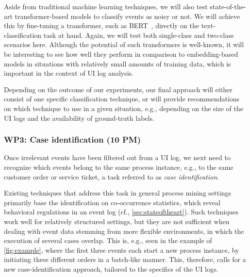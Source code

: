 Aside from traditional machine learning techniques, we will also test state-of-the-art transformer-based models to classify events as noisy or not. We will achieve this by fine-tuning a transformer, such as BERT~\cite{Devlin2019}, directly on the text-classification task at hand. 
Again, we will test both single-class and two-class scenarios here.
\newline Although the potential of such transformers is well-known, it will be interesting to see how well they perform in comparison to embedding-based models in situations with relatively small amounts of training data, which is important in the context of UI log analysis.

Depending on the outcome of our experiments, our final approach will either consist of one specific classification technique, or will provide recommendations on which technique to use in a given situation, e.g., depending on the size of the UI logs and the availability of ground-truth labels.



\subsubsection{WP3: Case identification (10 PM)}
\label{sec:wp3}

Once irrelevant events have been filtered out from  a UI log, we next need to recognize which events belong to the same process instance, e.g., to the same customer order or service ticket, a task referred to as \emph{case identification}.

Existing techniques that address this task in general process mining settings primarily base the identification on co-occurrence statistics, which reveal behavioral regulations in an event log (cf., \autoref{sec:stateoftheart}). Such techniques work well for relatively structured settings, 
but they are not sufficient when dealing with event data stemming from more flexible environments, in which the execution of several cases overlap. This is, e.g., seen in the example of \autoref{fig:example}, where the first three events each start a new process instance, by initiating three different orders in a batch-like manner. This, therefore, calls for a new case-identification approach, tailored to the specifics of the UI logs.

